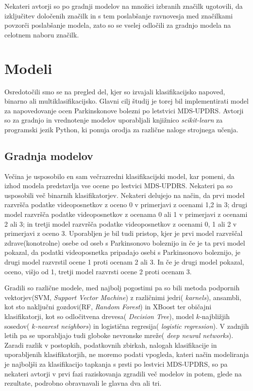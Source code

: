 \documentclass[
]{article}
\begin{document}
Nekateri avtorji so po gradnji modelov na množici izbranih značilk
ugotovili, da izključitev določenih značilk in s tem poslabšanje
ravnovesja med značilkami povzorči poslabšanje modela, zato so se vselej
odločili za gradnjo modela na celotnem naboru značilk.

\section{Modeli}\label{modeli}

Osredotočili smo se na pregled del, kjer so izvajali klasifikacijsko
napoved, binarno ali multiklasifikacijsko. Glavni cilj študij je torej
bil implementirati model za napovedovanje ocen Parkinskonove bolezni po
letstvici MDS-UPDRS. Avtorji so za gradnjo in vrednotenje modelov
uporabljali knjižnico \emph{scikit-learn} za programski jezik Python, ki
ponuja orodja za različne naloge strojnega učenja.

\subsection{Gradnja modelov}\label{gradnja-modelov}

Večina je usposobilo en sam večrazredni klasifikacijski model, kar
pomeni, da izhod modela predstavlja vse ocene po lestvici MDS-UPDRS.
Nekateri pa so usposobili več binarnih klasifikatorjev. Nekateri
delujejo na način, da prvi model razvršča podatke videoposnetkov z oceno
0 v primerjavi z ocenami 1,2 in 3; drugi model razvršča podatke
videoposnetkov z ocenama 0 ali 1 v primerjavi z ocenami 2 ali 3; in
tretji model razvršča podatke videoposnetkov z ocenami 0, 1 ali 2 v
primerjavi z oceno 3. Uporabljen je bil tudi pristop, kjer je prvi model
razvrščal zdrave(konotrolne) osebe od oseb s Parkinsonovo boleznijo in
če je ta prvi model pokazal, da podatki videoposnetka pripadajo osebi s
Parkinsonovo boleznijo, je drugi model razvrstil ocene 1 proti ocenam 2
ali 3. In če je drugi model pokazal, oceno, višjo od 1, tretji model
razvrsti ocene 2 proti ocenam 3.

Gradili so različne modele, med najbolj pogostimi pa so bili metoda
podpornih vektorjev(SVM, \emph{Support Vector Machine}) z različnimi
jedri( \emph{karnels}), ansambli, kot sto naključni gozdovi(RF,
\emph{Random Forest}) in XBoost ter običajni klasifikatorji, kot so
odločitvena drevesa( \emph{Decision Tree}), model \(k\)-najbližjih
sosedov( \emph{\(k\)-nearest neighbors}) in logistična regresija(
\emph{logistic regression}). V zadnjih letih pa se uporabljajo tudi
globoke nevronske mreže( \emph{deep neural networks}).\\
Zaradi razlik v postopkih, podatkovnih zbirkah, nalogah klasifikacije in
uporabljenih klasifikatorjih, ne moremo podati vpogleda, kateri način
modeliranja je najboljši za klasifikacijo tapkanja s prsti po lestvici
MDS-UPDRS, so pa nekateri avtorji v prvi fazi raziskovanja zgradili več
modelov in potem, glede na rezultate, podrobno obravnavali le glavna dva
ali tri.
\end{document}
